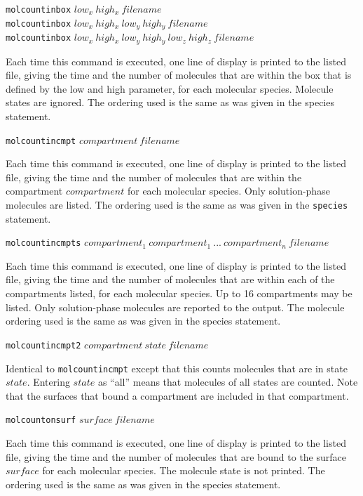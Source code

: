 \documentclass {book}
\newcommand {\ttt} {\texttt}
\begin{document}
\begin{description}
\item{\ttt{molcountinbox} $low_x\ high_x\ filename$\\
\ttt{molcountinbox} $low_x\ high_x\ low_y\ high_y\ filename$\\
\ttt{molcountinbox} $low_x\ high_x\ low_y\ high_y\ low_z\ high_z\ filename$}

Each time this command is executed, one line of display is printed to the listed file, giving the time and the number of molecules that are within the box that is defined by the low and high parameter, for each molecular species. Molecule states are ignored. The ordering used is the same as was given in the species statement.

\item{\ttt{molcountincmpt} $compartment\ filename$}

Each time this command is executed, one line of display is printed to the listed file, giving the time and the number of molecules that are within the compartment $compartment$ for each molecular species. Only solution-phase molecules are listed. The ordering used is the same as was given in the \ttt{species} statement.

\item{\ttt{molcountincmpts} $compartment_1\ compartment_1\ ...\ compartment_n\ filename$}

Each time this command is executed, one line of display is printed to the listed file, giving the time and the number of molecules that are within each of the compartments listed, for each molecular species. Up to 16 compartments may be listed. Only solution-phase molecules are reported to the output. The molecule ordering used is the same as was given in the species statement.

\item{\ttt{molcountincmpt2} $compartment\ state\ filename$}

Identical to \ttt{molcountincmpt} except that this counts molecules that are in state $state$. Entering $state$ as ``all'' means that molecules of all states are counted. Note that the surfaces that bound a compartment are included in that compartment.

\item{\ttt{molcountonsurf} $surface\ filename$}

Each time this command is executed, one line of display is printed to the listed file, giving the time and the number of molecules that are bound to the surface $surface$ for each molecular species. The molecule state is not printed. The ordering used is the same as was given in the species statement.


\end{description}
\end{document}
